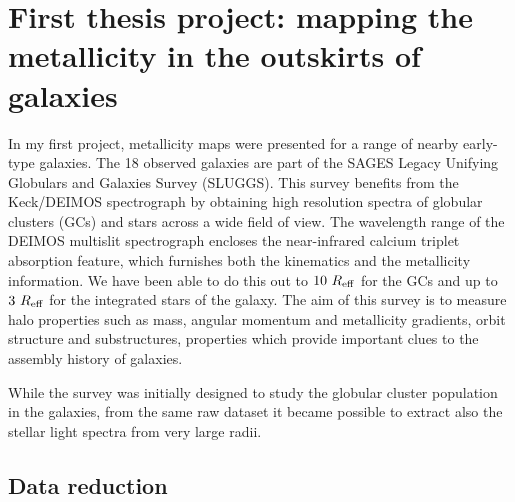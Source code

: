 \section{First thesis project: mapping the metallicity in the outskirts of galaxies}
%
	In my first project, metallicity maps were presented for a range of nearby early-type galaxies.
	The 18 observed galaxies are part of the SAGES Legacy Unifying Globulars %
	and Galaxies Survey (SLUGGS).
	This survey benefits from the Keck/DEIMOS spectrograph by obtaining high resolution spectra of globular clusters (GCs)
	and stars across a wide field of view. 
	The wavelength range of the DEIMOS multislit spectrograph encloses the near-infrared calcium triplet absorption 
	feature, which furnishes both the kinematics and the metallicity information. 
	We have been able to do this out to $10~R_{\rm{eff}}$ for the GCs and 
	up to $3~R_{\rm{eff}}$ for the integrated stars of the galaxy. 
	The aim of this survey is to measure halo properties such as mass, angular momentum and metallicity gradients, 
	orbit structure and substructures, properties which provide important clues to the assembly history of galaxies. 

	While the survey was initially designed to study the globular cluster population in the galaxies, 
	from the same raw dataset it became possible to extract also the stellar light spectra from very  
	large radii. 

	
	\subsection{Data reduction}
	

